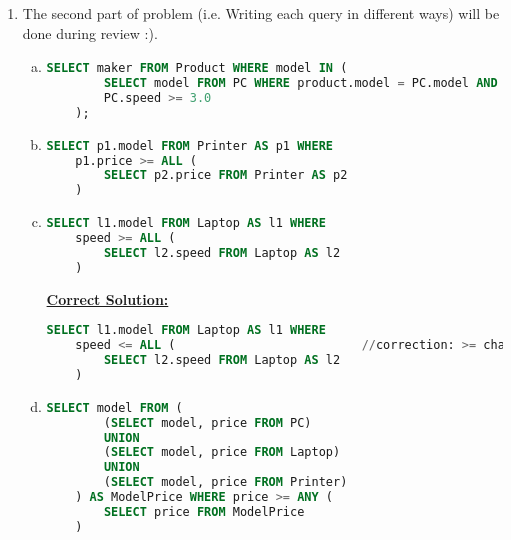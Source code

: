\documentclass[12pt]{article}
\begin{document}
\begin{enumerate}[1.]
\begin{enumerate}[a)]
    \end{enumerate}

    \item

    The second part of problem (i.e. Writing each query in different ways) will
    be done during review :).

    \bigskip

    \begin{enumerate}[a)]
        \item

    \begin{lstlisting}[language=SQL]
    SELECT maker FROM Product WHERE model IN (
        SELECT model FROM PC WHERE product.model = PC.model AND
        PC.speed >= 3.0
    );
    \end{lstlisting}


        \item

    \begin{lstlisting}[language=SQL]
    SELECT p1.model FROM Printer AS p1 WHERE
    p1.price >= ALL (
        SELECT p2.price FROM Printer AS p2
    )
    \end{lstlisting}

        \item

    \begin{lstlisting}[language=SQL]
    SELECT l1.model FROM Laptop AS l1 WHERE
    speed >= ALL (
        SELECT l2.speed FROM Laptop AS l2
    )
    \end{lstlisting}

        \begin{mdframed}

        \underline{\textbf{Correct Solution:}}

    \begin{lstlisting}[language=SQL]
    SELECT l1.model FROM Laptop AS l1 WHERE
    speed <= ALL (                          //correction: >= changed to <=
        SELECT l2.speed FROM Laptop AS l2
    )
    \end{lstlisting}

        \end{mdframed}

        \item

    \begin{lstlisting}[language=SQL]
    SELECT model FROM (
        (SELECT model, price FROM PC)
        UNION
        (SELECT model, price FROM Laptop)
        UNION
        (SELECT model, price FROM Printer)
    ) AS ModelPrice WHERE price >= ANY (
        SELECT price FROM ModelPrice
    )
    \end{lstlisting}


\end{enumerate}
\end{enumerate}
\end{document}
